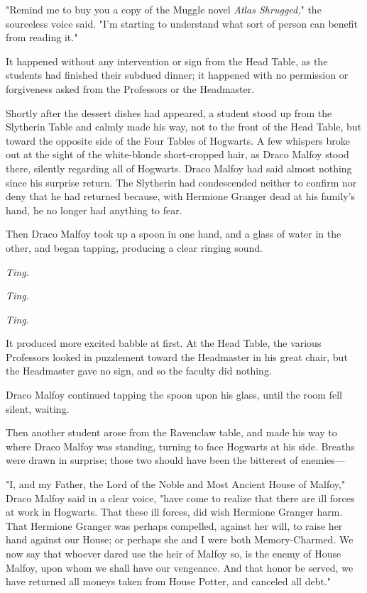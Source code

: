 "Remind me to buy you a copy of the Muggle novel \emph{Atlas Shrugged,}" the
sourceless voice said. "I'm starting to understand what sort of person can
benefit from reading it."

It happened without any intervention or sign from the Head Table, as the
students had finished their subdued dinner; it happened with no permission or
forgiveness asked from the Professors or the Headmaster.

Shortly after the dessert dishes had appeared, a student stood up from the
Slytherin Table and calmly made his way, not to the front of the Head Table,
but toward the opposite side of the Four Tables of Hogwarts. A few whispers
broke out at the sight of the white-blonde short-cropped hair, as Draco Malfoy
stood there, silently regarding all of Hogwarts. Draco Malfoy had said almost
nothing since his surprise return. The Slytherin had condescended neither to
confirm nor deny that he had returned because, with Hermione Granger dead at
his family's hand, he no longer had anything to fear.

Then Draco Malfoy took up a spoon in one hand, and a glass of water in the
other, and began tapping, producing a clear ringing sound.

\emph{Ting.}

\emph{Ting.}

\emph{Ting.}

It produced more excited babble at first. At the Head Table, the various
Professors looked in puzzlement toward the Headmaster in his great chair, but
the Headmaster gave no sign, and so the faculty did nothing.

Draco Malfoy continued tapping the spoon upon his glass, until the room fell
silent, waiting.

Then another student arose from the Ravenclaw table, and made his way to where
Draco Malfoy was standing, turning to face Hogwarts at his side. Breaths were
drawn in surprise; those two should have been the bitterest of enemies---

"I, and my Father, the Lord of the Noble and Most Ancient House of Malfoy,"
Draco Malfoy said in a clear voice, "have come to realize that there are ill
forces at work in Hogwarts. That these ill forces, did wish Hermione Granger
harm. That Hermione Granger was perhaps compelled, against her will, to raise
her hand against our House; or perhaps she and I were both Memory-Charmed. We
now say that whoever dared use the heir of Malfoy so, is the enemy of House
Malfoy, upon whom we shall have our vengeance. And that honor be served, we
have returned all moneys taken from House Potter, and canceled all debt."

